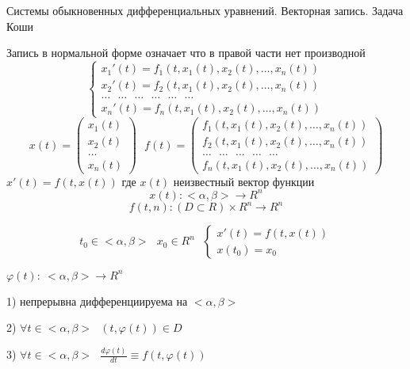 \begin{title}[\Large]
  Системы обыкновенных дифференциальных уравнений. Векторная запись.
  Задача Коши
\end{title}

\begin{define}
  Запись в нормальной форме означает что в правой части нет производной
  $$
  \left\{
  \begin{array}{l}
    x_1'(t) = f_1(t, x_1(t), x_2(t), \ldots, x_n(t)) \\
    x_2'(t) = f_2(t, x_1(t), x_2(t), \ldots, x_n(t)) \\
    \ldots ~~~ \ldots ~~~ \ldots ~~~ \ldots ~~~ \ldots ~~~ \ldots \\
    x_n'(t) = f_n(t, x_1(t), x_2(t), \ldots, x_n(t))
  \end{array}
  \right.
  $$
  $$
  x(t) =
  \left(
  \begin{array}{l}
    x_1(t) \\
    x_2(t) \\
    \ldots \\
    x_n(t)
  \end{array}
  \right) ~~~
  f(t) =
  \left(
  \begin{array}{l}
   f_1(t, x_1(t), x_2(t), \ldots, x_n(t)) \\
   f_2(t, x_1(t), x_2(t), \ldots, x_n(t)) \\
    \ldots ~~~ \ldots ~~~ \ldots ~~~ \ldots ~~~ \ldots \\
   f_n(t, x_1(t), x_2(t), \ldots, x_n(t))
  \end{array}
  \right)
  $$
  $x'(t) = f(t, x(t))$ где $x(t)$ неизвестный вектор функции
  $$
  x(t):<\alpha, \beta> \to R^n
  $$
  $$
  f(t, n): (D \subset R) \times R^n \to R^n
  $$
\end{define}

\begin{block}
  $$
  t_0 \in <\alpha, \beta> ~~~ x_0 \in R^n ~~~
  \left\{
  \begin{array}{l}
    x'(t) = f(t,x(t)) \\
    x(t_0) = x_0
  \end{array}
  \right.
  $$
\end{block}

\begin{block}
  $\varphi(t): ~ <\alpha, \beta> \to R^n$

  1) непрерывна дифференциируема на $<\alpha, \beta>$

  2) $\forall t \in <\alpha, \beta> ~~~ (t, \varphi(t)) \in D$

  3) $\forall t \in <\alpha, \beta> ~~~ \frac{d\varphi(t)}{dt} \equiv
  f(t, \varphi(t))$
\end{block}

